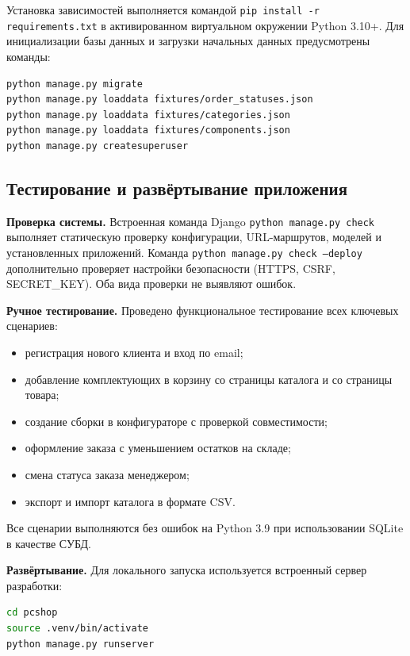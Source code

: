 \documentclass[14pt, a4paper]{extarticle}
\begin{document}
Установка зависимостей выполняется командой \texttt{pip install -r requirements.txt} в активированном виртуальном окружении Python 3.10+. Для инициализации базы данных и загрузки начальных данных предусмотрены команды:

\begin{lstlisting}[language=bash, caption={Команды инициализации проекта}]
python manage.py migrate
python manage.py loaddata fixtures/order_statuses.json
python manage.py loaddata fixtures/categories.json
python manage.py loaddata fixtures/components.json
python manage.py createsuperuser
\end{lstlisting}

\subsection{Тестирование и развёртывание приложения}

\textbf{Проверка системы.} Встроенная команда Django \texttt{python manage.py check} выполняет статическую проверку конфигурации, URL-маршрутов, моделей и установленных приложений. Команда \texttt{python manage.py check --deploy} дополнительно проверяет настройки безопасности (HTTPS, CSRF, SECRET\_KEY). Оба вида проверки не выявляют ошибок.

\textbf{Ручное тестирование.} Проведено функциональное тестирование всех ключевых сценариев:
\begin{itemize}
    \item регистрация нового клиента и вход по email;
    \item добавление комплектующих в корзину со страницы каталога и со страницы товара;
    \item создание сборки в конфигураторе с проверкой совместимости;
    \item оформление заказа с уменьшением остатков на складе;
    \item смена статуса заказа менеджером;
    \item экспорт и импорт каталога в формате CSV.
\end{itemize}

Все сценарии выполняются без ошибок на Python 3.9 при использовании SQLite в качестве СУБД.

\textbf{Развёртывание.} Для локального запуска используется встроенный сервер разработки:

\begin{lstlisting}[language=bash, caption={Запуск сервера разработки}]
cd pcshop
source .venv/bin/activate
python manage.py runserver
\end{lstlisting}
\end{document}
